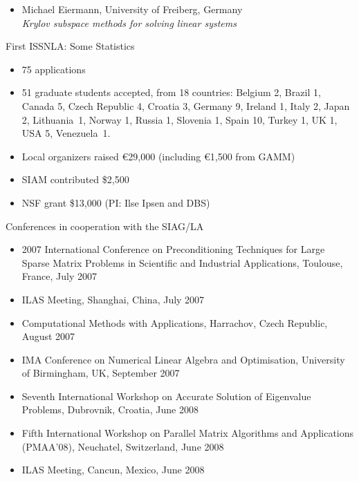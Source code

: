 \documentclass[]{seminar}
\begin{document}
{\begin{slide}
\begin{itemize}
\item Michael Eiermann, University of Freiberg, Germany\\
\textit{Krylov subspace methods for solving linear systems}
\end{itemize}


\end{slide}
\begin{slide}

\begin{center}
{\color{blue}
First ISSNLA: Some Statistics
}
\end{center}

\begin{itemize}
\item 75 applications
\item 51 graduate students accepted, from 18 countries:
Belgium 2, Brazil 1, Canada 5, Czech Republic 4, Croatia 3,
Germany 9, Ireland 1, Italy 2, Japan 2,
Lithuania~1, Norway 1,
Russia 1, Slovenia 1, Spain 10, Turkey 1, UK 1, USA 5,
Venezuela~1.
\item  Local organizers raised \euro{}{29,000}
(including \euro{1,500} from GAMM)
\item SIAM contributed \$2,500
\item NSF grant \$13,000 (PI: Ilse Ipsen and DBS)
\end{itemize}


\end{slide}
\begin{slide}


\begin{center}
{\color{blue}
Conferences in cooperation with the SIAG/LA
}
\end{center}

\begin{itemize}
\item
2007 International Conference on Preconditioning Techniques for Large 
Sparse Matrix Problems
in Scientific and Industrial Applications, Toulouse, France, July 2007
\item
ILAS Meeting, Shanghai, China, July 2007
\item
Computational Methods with Applications, Harrachov, Czech Republic, 
August 2007
\item
IMA Conference on Numerical Linear Algebra and Optimisation, 
University of Birmingham,
UK, September 2007
\item
Seventh International Workshop on Accurate Solution of 
Eigenvalue Problems, Dubrovnik,
Croatia, June 2008
\item
Fifth International Workshop
on Parallel Matrix Algorithms and Applications (PMAA'08),
Neuchatel, Switzerland, June 2008
\item
ILAS Meeting, Cancun, Mexico, June 2008
\end{itemize}


\end{slide}}
\end{document}
